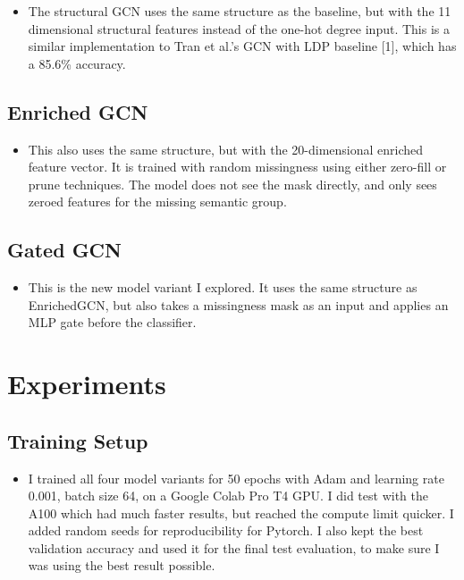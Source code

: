 \documentclass[12pt]{article}
\begin{document}
\begin{itemize}
    \item The structural GCN uses the same structure as the baseline, but with the 11 dimensional structural features instead of the one-hot degree input. This is a similar implementation to Tran et al.'s GCN with LDP baseline [1], which has a 85.6\% accuracy. 
\end{itemize}

\subsection{Enriched GCN}

\begin{itemize}
    \item This also uses the same structure, but with the 20-dimensional enriched feature vector. It is trained with random missingness using either zero-fill or prune techniques. The model does not see the mask directly, and only sees zeroed features for the missing semantic group. 
\end{itemize}

\subsection{Gated GCN}

\begin{itemize}
    \item This is the new model variant I explored. It uses the same structure as EnrichedGCN, but also takes a missingness mask as an input and applies an MLP gate before the classifier.
\end{itemize}

\section{Experiments}

\subsection{Training Setup}

\begin{itemize}
    \item I trained all four model variants for 50 epochs with Adam and learning rate 0.001, batch size 64, on a Google Colab Pro T4 GPU. I did test with the A100 which had much faster results, but reached the compute limit quicker. I added random seeds for reproducibility for Pytorch. I also kept the best validation accuracy and used it for the final test evaluation, to make sure I was using the best result possible. 
\end{itemize}
\end{document}
